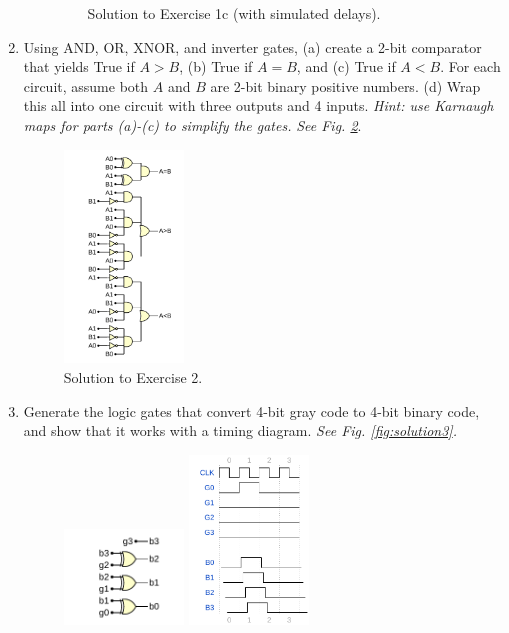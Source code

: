 \documentclass[10pt]{article}
\begin{document}
\begin{enumerate}
\begin{itemize}
\begin{figure}[hb]
\caption{\label{fig:solution1} Solution to Exercise 1c (with simulated delays).}
\end{figure}
\clearpage
\end{itemize}
\item Using AND, OR, XNOR, and inverter gates, (a) create a 2-bit comparator that yields True if $A > B$, (b) True if $A = B$, and (c) True if $A < B$.  For each circuit, assume both $A$ and $B$ are 2-bit binary positive numbers. (d) Wrap this all into one circuit with three outputs and 4 inputs.  \textit{Hint: use Karnaugh maps for parts (a)-(c) to simplify the gates.} \textit{See Fig. \ref{fig:solution2}}.
\begin{figure}
\centering
\includegraphics[width=0.3\textwidth]{figures/gateExample12.pdf}
\caption{\label{fig:solution2} Solution to Exercise 2.}
\end{figure}
\item Generate the logic gates that convert 4-bit gray code to 4-bit binary code, and show that it works with a timing diagram. \textit{See Fig. \ref{fig:solution3}.}
\begin{figure}[hb]
\centering
\includegraphics[width=0.3\textwidth]{figures/gateExample13.pdf}
\includegraphics[width=0.3\textwidth]{figures/timingExample17.pdf}

\end{figure}
\end{enumerate}
\end{document}
